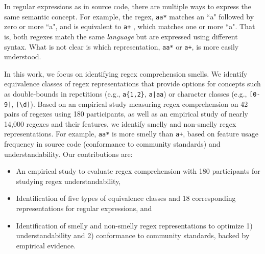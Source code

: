 In regular expressions as in source code, there are multiple ways to express the same semantic concept.
For example, the regex, \verb!aa*! matches an ``a" followed by zero or more ``a", and is equivalent to \verb!a+! , which matches one or more ``a".
That is, both regexes match the same \emph{language} but are expressed using different syntax. What is not clear is which representation, \verb!aa*! or \verb!a+!, is more easily understood.

In this work, we focus on identifying regex comprehension smells.
We identify equivalence classes of regex representations that provide options for concepts such as double-bounds in repetitions (e.g., \verb!a{1,2}!, \verb!a|aa!) or
character classes (e.g., \verb![0-9]!, \verb![\d]!).
Based on an empirical study measuring regex comprehension on 42 pairs of regexes using 180 participants, as well as an empirical study of nearly 14,000 regexes and their features, we identify smelly and non-smelly regex representations. For example, \verb!aa*! is more smelly than \verb!a+!, based on feature usage frequency in source code (conformance to community standards) and understandability.
Our contributions are:

\vspace{-3pt}
\begin{itemize}
\item An empirical study to evaluate regex comprehension with 180 participants for studying regex understandability,
\item Identification of five types of equivalence classes and 18 corresponding representations for regular expressions, and
\item Identification of smelly and non-smelly regex representations to optimize 1) understandability and 2) conformance to community standards, backed by empirical evidence.
\end{itemize}
\vspace{-3pt}

